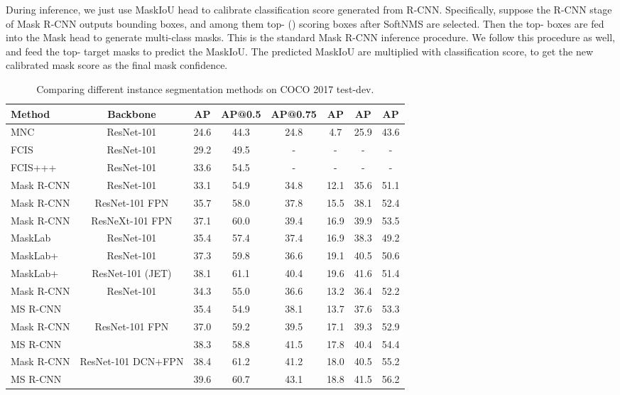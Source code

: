 \documentclass[10pt,twocolumn,letterpaper]{article}
\begin{document}
    During inference, we just use MaskIoU head to calibrate classification score generated from R-CNN. Specifically, suppose the R-CNN stage of Mask R-CNN outputs  bounding boxes, and among them top- (\ie ) scoring boxes after SoftNMS \cite{bodla2017softnms} are selected. Then the top- boxes are fed into the Mask head to generate multi-class masks. This is the standard Mask R-CNN inference procedure. We follow this procedure as well, and feed the top- target masks to predict the MaskIoU. The predicted MaskIoU are multiplied with classification score, to get the new calibrated mask score as the final mask confidence. 
    



\begin{table*}[ht!]
\caption{Comparing different instance segmentation methods on COCO 2017 test-dev.}
  \centering
  \vspace{3mm}
  \begin{tabular}{l|c|c c c|c c c}
  \toprule
Method & Backbone & AP & AP@0.5 & AP@0.75 & AP & AP & AP\\
    \midrule
    MNC \cite{dai2016mnc} &  ResNet-101 & 24.6 & 44.3 & 24.8 & 4.7 & 25.9 & 43.6\\
    FCIS \cite{fcis} &  ResNet-101 & 29.2 & 49.5 & - & - & - & -\\
    FCIS+++ \cite{fcis}  & ResNet-101 & 33.6 & 54.5 & - & - & - & -\\
    Mask R-CNN \cite{he2017maskrcnn} & ResNet-101 & 33.1 & 54.9 & 34.8 & 12.1 & 35.6 & 51.1\\
    Mask R-CNN \cite{he2017maskrcnn}  & ResNet-101 FPN & 35.7 & 58.0 & 37.8 & 15.5 & 38.1 & 52.4\\ 
    Mask R-CNN \cite{he2017maskrcnn}&  ResNeXt-101 FPN & 37.1 & 60.0 & 39.4 & 16.9 & 39.9 & 53.5\\
    MaskLab \cite{chen2017masklab}  & ResNet-101 & 35.4 & 57.4 & 37.4 & 16.9 & 38.3 & 49.2\\
    MaskLab+ \cite{chen2017masklab} & ResNet-101 & 37.3 & 59.8 & 36.6 & 19.1 & 40.5 & 50.6\\
    MaskLab+ \cite{chen2017masklab}  & ResNet-101 (JET) & 38.1 & 61.1 & 40.4 & 19.6 & 41.6 & 51.4\\ 
\midrule
    Mask R-CNN & \multirow{2}{*}{ResNet-101}  & 34.3 & 55.0 & 36.6 & 13.2 & 36.4 & 52.2\\
    MS R-CNN  &    & 35.4 & 54.9 & 38.1 & 13.7 & 37.6 & 53.3\\ 
\midrule
    Mask R-CNN & \multirow{2}{*}{ResNet-101 FPN} & 37.0 & 59.2 & 39.5 & 17.1 & 39.3 & 52.9\\
    MS R-CNN  &   & 38.3 & 58.8 & 41.5 & 17.8 & 40.4 & 54.4\\
\midrule
    Mask R-CNN & \multirow{2}{*}{ResNet-101 DCN+FPN}  & 38.4 & 61.2 & 41.2 & 18.0 & 40.5 & 55.2\\
    MS R-CNN  &    & 39.6 & 60.7 & 43.1 & 18.8 & 41.5 & 56.2\\
    \bottomrule
  \end{tabular}
  \label{table:testdevresults}
\end{table*}
\end{document}
